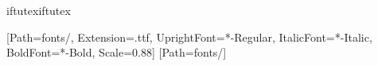 
\usepackage[a4paper,margin=1.5cm]{geometry}
\usepackage{amsmath}
\usepackage{iftex}
\expandafter\ifx\csname iftutex\endcsname\relax\expandafter\newif\csname iftutex\endcsname\fi
\iftutex
  \usepackage{fontspec}
  \usepackage{unicode-math}
  \setmainfont{\azmainfont}
  \setsansfont{\azmainfont}
  \setmonofont{JetBrainsMono}[Path=fonts/, Extension=.ttf, UprightFont=*-Regular, ItalicFont=*-Italic,
    BoldFont=*-Bold, Scale=0.88]
  [Path=fonts/]
\else
  \usepackage[T1]{fontenc}
  \usepackage[utf8]{inputenc}
  \usepackage{textcomp}
  \usepackage{amssymb}  %
  \renewcommand{\familydefault}{\sfdefault}
\fi
\ifPDFTeX\usepackage{microtype}\else\iftutex\usepackage{microtype}\fi\fi
\AtBeginDocument{\let\origunderscore\_\renewcommand{\_}{\origunderscore\allowbreak}}
\usepackage{graphicx}
\usepackage{xcolor}
\usepackage[normalem]{ulem} %
\usepackage{array,calc,longtable,booktabs}
\usepackage{enumitem}
\usepackage{listings}
\usepackage{tikz}
\usetikzlibrary{arrows.meta,positioning,calc,shapes.geometric}
\usepackage[numbers,sort&compress,super]{natbib}
